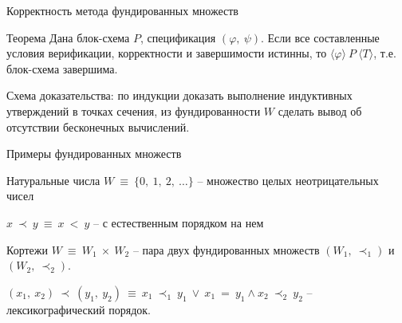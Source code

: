 \documentclass[hyperref={unicode=true}]{beamer}
\begin{document}
	\begin{frame}{Корректность метода фундированных множеств}

	\begin{block}{Теорема}
	Дана блок-схема $P$, спецификация $(\varphi,~\psi)$. Если все составленные условия верификации, корректности и завершимости истинны, то $\langle\varphi\rangle~P~\langle T \rangle$, т.е. блок-схема завершима.
	\end{block}

    Схема доказательства: по индукции доказать выполнение индуктивных утверждений в точках сечения, из фундированности $W$ сделать вывод об отсутствии бесконечных вычислений.
	\end{frame}

	\begin{frame}{Примеры фундированных множеств}
	\begin{block}{Натуральные числа}
	$W~\equiv~\{0,~1,~2,~\ldots\}$ -- множество целых неотрицательных чисел

	$x~\prec~y~\equiv~x~<~y$ -- с естественным порядком на нем
	\end{block}
	\begin{block}{Кортежи}
	$W~\equiv~W_1~\times~W_2$ -- пара двух фундированных множеств $(W_1,~\prec_1)$ и $(W_2,~\prec_2)$.

	$(x_1,~x_2)~\prec~(y_1,~y_2) ~\equiv~ x_1~\prec_1~y_1~\lor~x_1~=~y_1 \land x_2~\prec_2~y_2$ -- лексикографический порядок.
	\end{block}
	\end{frame}
\end{document}
